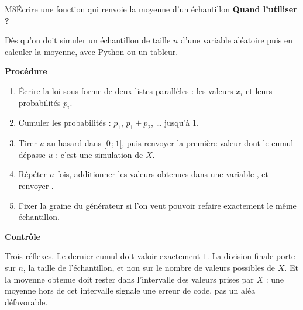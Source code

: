 \begin{fichemethode}{M8}{Écrire une fonction qui renvoie la moyenne d'un échantillon}
  \textbf{Quand l'utiliser ?}

  Dès qu'on doit simuler un échantillon de taille $n$ d'une variable aléatoire
  puis en calculer la moyenne, avec Python ou un tableur.

  \textbf{Procédure}
  \begin{enumerate}
    \item Écrire la loi sous forme de deux listes parallèles : les valeurs
          $x_i$ et leurs probabilités $p_i$.
    \item Cumuler les probabilités : $p_1$, $p_1+p_2$, \dots{} jusqu'à $1$.
    \item Tirer $u$ au hasard dans $[0\,;1[$, puis renvoyer la première valeur
          dont le cumul dépasse $u$ : c'est une simulation de $X$.
    \item Répéter $n$ fois, additionner les valeurs obtenues dans une variable
          , et renvoyer .
    \item Fixer la graine du générateur si l'on veut pouvoir refaire
          exactement le même échantillon.
  \end{enumerate}

  \textbf{Contrôle}

  Trois réflexes. Le dernier cumul doit valoir exactement $1$. La division
  finale porte sur $n$, la taille de l'échantillon, et non sur le nombre de
  valeurs possibles de $X$. Et la moyenne obtenue doit rester dans l'intervalle
  des valeurs prises par $X$ : une moyenne hors de cet intervalle signale une
  erreur de code, pas un aléa défavorable.
\end{fichemethode}
